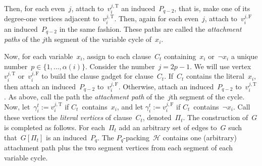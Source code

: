 \documentclass[envcountsame,numbook,smallextended]{svjour3}
\numberwithin{equation}{section}
\numberwithin{figure}{section}
\newcommand{\occ}{\ensuremath{\alpha}}
\newcommand{\num}{\ensuremath{\gamma}}
\newcommand{\packing}{\ensuremath{\mathcal H}}
\begin{document}
\begin{construction}
  Then, for each even~$j$,
  attach to~$v_{i}^{j,\text{T}}$ an induced~\(P_{q-2}\), that is,
  make one of its degree-one vertices adjacent to~$v_{i}^{j,\text{T}}$.
  Then, again for each even~$j$,
  attach to~$v_{i}^{j,\text{F}}$ an induced~\(P_{q-2}\)
  in the same fashion.
  These paths are called
  the \emph{attachment paths} of the $j$th segment
  of the variable cycle of~$x_i$.
  
  Now, for each variable~$x_i$,
  assign to each clause~$C_t$ containing~$x_i$ or~$\neg x_i$
  a unique number~$p \in \{1, \ldots , \occ(i)\}$.
  Consider the number~$j=2p-1$.
  We will use vertex~$v_i^{j,\text{T}}$ or~$v_i^{j,\text{F}}$
  to build the clause gadget for clause~$C_t$.
  If~$C_t$ contains the literal~$x_i$, then attach an
  induced~\(P_{q-2}\) to~$v_{i}^{j,\text{F}}$.
  Otherwise,
  attach an induced~\(P_{q-2}\) to~$v_{i}^{j,\text{T}}$.
  As above,
  call the path the \emph{attachment path}
  of the~$j$th segment of the cycle.
  Now, let~$\num_i^t:=v_i^{j,\text{T}}$
  if $C_t$~contains~$x_i$,
  and let $\num_i^t:=v_i^{j,\text{F}}$
  if $C_t$~contains~$\neg x_i$.
  Call these vertices the \emph{literal vertices} of clause~$C_t$,
  denoted~$\Pi_t$.
  The construction of~$G$ is completed as follows. For each~$\Pi_t$ add an arbitrary set of edges to~$G$ such that~$G[\Pi_t]$ is an induced~$P_q$.
  The $P_q$-packing~$\packing$ contains
  one (arbitrary) attachment path
  plus the two segment vertices
  from each segment
  of each variable cycle.
\end{construction}
\end{document}
